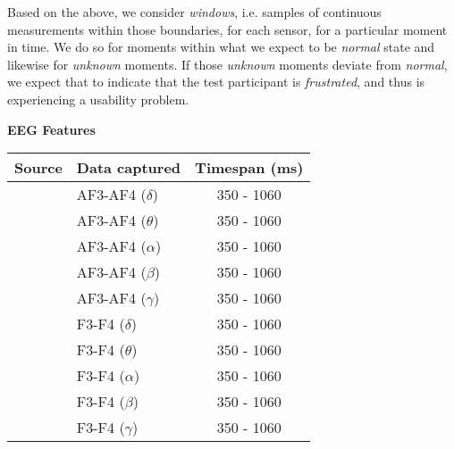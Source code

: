 Based on the above, we consider \textit{windows}, i.e. samples of continuous measurements within those boundaries, for
each sensor, for a particular moment in time. We do so for moments within what we expect to be \textit{normal} state and
likewise for \textit{unknown} moments. If those \textit{unknown} moments deviate from \textit{normal}, we expect that to
indicate that the test participant is \textit{frustrated}, and thus is experiencing a usability problem.

\begin{table}[H]
    \centering

    {\large \textbf{EEG Features}}\vspace{2pt}
    \begin{tabularx}{\columnwidth}{cXc}
        \toprule
        \textbf{Source} & \textbf{Data captured} & \textbf{Timespan (ms)} \\
        \midrule
        \small{\cite{eeg_music_listening,eeg_timespan_1,eeg_electrodes_1,eeg_electrodes_0}} & AF3-AF4 ($\delta$) & 350 - 1060 \\
        \small{\cite{eeg_music_listening,eeg_timespan_1,eeg_electrodes_1,eeg_electrodes_0}} & AF3-AF4 ($\theta$) & 350 - 1060 \\
        \small{\cite{eeg_music_listening,eeg_timespan_1,eeg_electrodes_1,eeg_electrodes_0}} & AF3-AF4 ($\alpha$) & 350 - 1060 \\
        \small{\cite{eeg_music_listening,eeg_timespan_1,eeg_electrodes_1,eeg_electrodes_0}} & AF3-AF4 ($\beta$)  & 350 - 1060 \\
        \small{\cite{eeg_music_listening,eeg_timespan_1,eeg_electrodes_1,eeg_electrodes_0}} & AF3-AF4 ($\gamma$) & 350 - 1060 \\
        \small{\cite{eeg_music_listening,eeg_timespan_1,eeg_electrodes_1,eeg_electrodes_0}} & F3-F4 ($\delta$) & 350 - 1060 \\
        \small{\cite{eeg_music_listening,eeg_timespan_1,eeg_electrodes_1,eeg_electrodes_0}} & F3-F4 ($\theta$) & 350 - 1060 \\
        \small{\cite{eeg_music_listening,eeg_timespan_1,eeg_electrodes_1,eeg_electrodes_0}} & F3-F4 ($\alpha$) & 350 - 1060 \\
        \small{\cite{eeg_music_listening,eeg_timespan_1,eeg_electrodes_1,eeg_electrodes_0}} & F3-F4 ($\beta$)  & 350 - 1060 \\
        \small{\cite{eeg_music_listening,eeg_timespan_1,eeg_electrodes_1,eeg_electrodes_0}} & F3-F4 ($\gamma$) & 350 - 1060 \\
        \bottomrule
    \end{tabularx}
    \label{[TABLE] features eeg}


\end{table}
